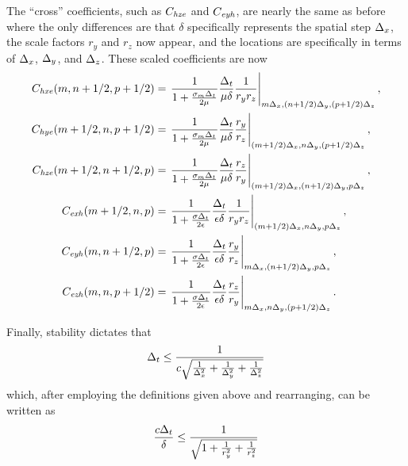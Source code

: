 The ``cross'' coefficients, such as $C_{\mathit{hze}}$ and $C_{\mathit{eyh}}$, are nearly
the same as before where the only differences are that $\delta$
specifically represents the spatial step $\Delta_x$, the scale factors
$r_y$ and $r_z$ now appear, and the locations are specifically in
terms of $\Delta_x$, $\Delta_y$, and $\Delta_z$.  These scaled coefficients are
now
\begin{align}
C_{\mathit{hxe}}(m,n+1/2,p+1/2) &=
  \left.
  \frac{1}{1+\frac{\sigma_m\Delta_t}{2\mu}}
  \frac{\Delta_t}{\mu\delta} \frac{1}{r_y r_z}
  \right|_{m\Delta_x,(n+1/2)\Delta_y,(p+1/2)\Delta_z}, 
  \label{eq:chxeScaled} \\
C_{\mathit{hye}}(m+1/2,n,p+1/2) &=
  \left.
  \frac{1}{1+\frac{\sigma_m\Delta_t}{2\mu}}
  \frac{\Delta_t}{\mu\delta} \frac{r_y}{r_z}
  \right|_{(m+1/2)\Delta_x,n\Delta_y,(p+1/2)\Delta_z}, \\
C_{\mathit{hze}}(m+1/2,n+1/2,p) &=
  \left.
  \frac{1}{1+\frac{\sigma_m\Delta_t}{2\mu}}
  \frac{\Delta_t}{\mu\delta} \frac{r_z}{r_y}
  \right|_{(m+1/2)\Delta_x,(n+1/2)\Delta_y,p\Delta_z}, \\
C_{\mathit{exh}}(m+1/2,n,p) &=
  \left.
  \frac{1}{1+\frac{\sigma\Delta_t}{2\epsilon}}
  \frac{\Delta_t}{\epsilon\delta} \frac{1}{r_y r_z}
  \right|_{(m+1/2)\Delta_x,n\Delta_y,p\Delta_z}, \\
C_{\mathit{eyh}}(m,n+1/2,p) &= 
  \left.
  \frac{1}{1+\frac{\sigma\Delta_t}{2\epsilon}}
    \frac{\Delta_t}{\epsilon\delta} \frac{r_y}{r_z}
  \right|_{m\Delta_x,(n+1/2)\Delta_y,p\Delta_z}, \\
C_{\mathit{ezh}}(m,n,p+1/2) &=
  \left.
  \frac{1}{1+\frac{\sigma\Delta_t}{2\epsilon}}
    \frac{\Delta_t}{\epsilon\delta} \frac{r_z}{r_y}
  \right|_{m\Delta_x,n\Delta_y,(p+1/2)\Delta_z}.
  \label{eq:cezhScaled}
\end{align}

Finally, stability dictates that 
\begin{equation}
\Delta_t \leq 
  \frac{1}{c\sqrt{\frac{1}{\Delta_x^2} +
                  \frac{1}{\Delta_y^2} +
                  \frac{1}{\Delta_z^2}}}
\end{equation}
which, after employing the definitions given above and rearranging,
can be written as
\begin{equation}
\frac{c\Delta_t}{\delta} \leq 
  \frac{1}{\sqrt{1 + \frac{1}{r_y^2} + \frac{1}{r_z^2}}}
  \label{eq:courantUnequalSpace}
\end{equation}

